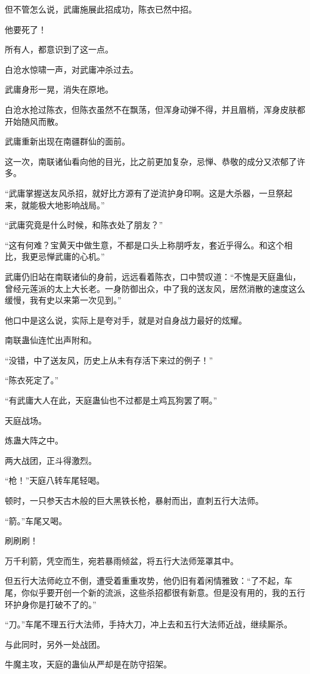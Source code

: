 \begin{this_body}
但不管怎么说，武庸施展此招成功，陈衣已然中招。

他要死了！

所有人，都意识到了这一点。

白沧水惊啸一声，对武庸冲杀过去。

武庸身形一晃，消失在原地。

白沧水抢过陈衣，但陈衣虽然不在飘荡，但浑身动弹不得，并且眉梢，浑身皮肤都开始随风而散。

武庸重新出现在南疆群仙的面前。

这一次，南联诸仙看向他的目光，比之前更加复杂，忌惮、恭敬的成分又浓郁了许多。

“武庸掌握送友风杀招，就好比方源有了逆流护身印啊。这是大杀器，一旦祭起来，就能极大地影响战局。”

“武庸究竟是什么时候，和陈衣处了朋友？”

“这有何难？宝黄天中做生意，不都是口头上称朋呼友，套近乎得么。和这个相比，我更忌惮武庸的心机。”

武庸仍旧站在南联诸仙的身前，远远看着陈衣，口中赞叹道：“不愧是天庭蛊仙，曾经元莲派的太上大长老。一身防御出众，中了我的送友风，居然消散的速度这么缓慢，我有史以来第一次见到。”

他口中是这么说，实际上是夸对手，就是对自身战力最好的炫耀。

南联蛊仙连忙出声附和。

“没错，中了送友风，历史上从未有存活下来过的例子！”

“陈衣死定了。”

“有武庸大人在此，天庭蛊仙也不过都是土鸡瓦狗罢了啊。”

天庭战场。

炼蛊大阵之中。

两大战团，正斗得激烈。

“枪！”天庭八转车尾轻喝。

顿时，一只参天古木般的巨大黑铁长枪，暴射而出，直刺五行大法师。

“箭。”车尾又喝。

刷刷刷！

万千利箭，凭空而生，宛若暴雨倾盆，将五行大法师笼罩其中。

但五行大法师屹立不倒，遭受着重重攻势，他仍旧有着闲情雅致：“了不起，车尾，你似乎要开创一个新的流派，这些杀招都很有新意。但是没有用的，我的五行环护身你是打破不了的。”

“刀。”车尾不理五行大法师，手持大刀，冲上去和五行大法师近战，继续厮杀。

与此同时，另外一处战团。

牛魔主攻，天庭的蛊仙从严却是在防守招架。


\end{this_body}
